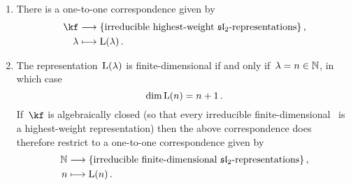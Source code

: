 \documentclass[a4paper, 11pt, oneside]{scrartcl}
\begin{document}
\begin{theorem}
  \leavevmode
  \begin{enumerate}
    \item
      There is a one-to-one correspondence given by
      \begin{align*}
        \kf
        &\longto
        \{
          \text{irreducible highest-weight~\representations{$\sllie_2$}}
        \} \,,
        \\
        \lambda
        &\longmapsto
        \irred(\lambda) \,.
      \end{align*}
    \item
      The representation~$\operatorname{L}(\lambda)$ is finite-dimensional if and only if~$\lambda = n \in \mathbb{N}$, in which case
      \[
        \dim \operatorname{L}(n)
        =
        n + 1 \,.
      \]
      If~$\kf$ is algebraically closed (so that every irreducible finite-dimensional~ is a highest-weight representation) then the above correspondence does therefore restrict to a one-to-one correspondence given by
      \begin{align*}
        \Natural
        &\longto
        \{ 
          \text{irreducible finite-dimensional~\representations{$\sllie_2$}}
        \} \,,
        \\
        n
        &\longmapsto
        \irred(n) \,.
      \end{align*}
  \end{enumerate}
\end{theorem}
\end{document}
